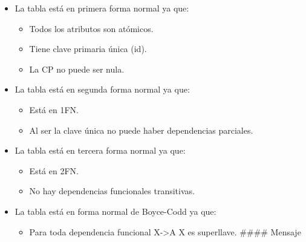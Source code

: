 \documentclass[12pt,a4paperpaper,]{report}
\providecommand{\tightlist}{%
  \setlength{\itemsep}{0pt}\setlength{\parskip}{0pt}}
\begin{document}
\begin{itemize}
\tightlist
\item
  La tabla está en primera forma normal ya que:

  \begin{itemize}
  \tightlist
  \item
    Todos los atributos son atómicos.
  \item
    Tiene clave primaria única (id).
  \item
    La CP no puede ser nula.
  \end{itemize}
\item
  La tabla está en segunda forma normal ya que:

  \begin{itemize}
  \tightlist
  \item
    Está en 1FN.
  \item
    Al ser la clave única no puede haber dependencias parciales.
  \end{itemize}
\item
  La tabla está en tercera forma normal ya que:

  \begin{itemize}
  \tightlist
  \item
    Está en 2FN.
  \item
    No hay dependencias funcionales transitivas.
  \end{itemize}
\item
  La tabla está en forma normal de Boyce-Codd ya que:

  \begin{itemize}
  \tightlist
  \item
    Para toda dependencia funcional X-\textgreater{}A X es superllave.
    \#\#\#\# Mensaje
  \end{itemize}
\end{itemize}
\end{document}
